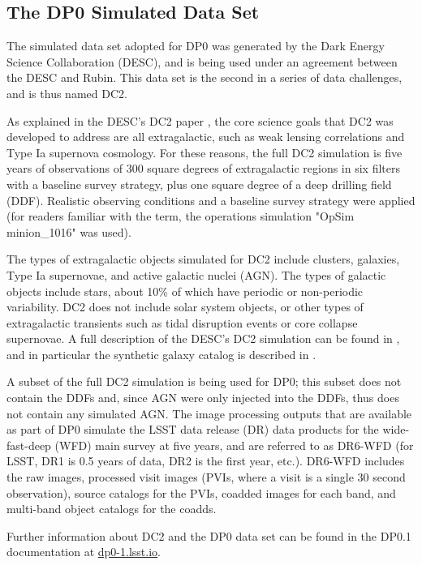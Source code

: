 \documentclass[DM,lsstdraft,authoryear,toc]{lsstdoc}
\begin{document}
\subsection{The DP0 Simulated Data Set}\label{ssec:intro_dc2}

The simulated data set adopted for DP0 was generated by the Dark Energy Science Collaboration (DESC), and is being used under an agreement between the DESC and Rubin.
This data set is the second in a series of data challenges, and is thus named DC2.

As explained in the DESC's DC2 paper \citep{2020arXiv201005926L}, the core science goals that DC2 was developed to address are all extragalactic, such as weak lensing correlations and Type Ia supernova cosmology.
For these reasons, the full DC2 simulation is five years of observations of 300 square degrees of extragalactic regions in six filters with a baseline survey strategy, plus one square degree of a deep drilling field (DDF).
Realistic observing conditions and a baseline survey strategy were applied (for readers familiar with the term, the operations simulation "OpSim minion\_1016" was used).

The types of extragalactic objects simulated for DC2 include clusters, galaxies, Type Ia supernovae, and active galactic nuclei (AGN).
The types of galactic objects include stars, about 10\% of which have periodic or non-periodic variability.
DC2 does not include solar system objects, or other types of extragalactic transients such as tidal disruption events or core collapse supernovae.
A full description of the DESC's DC2 simulation can be found in \citep{2020arXiv201005926L}, and in particular the synthetic galaxy catalog is described in \citet{2019ApJS..245...26K}.

A subset of the full DC2 simulation is being used for DP0; this subset does not contain the DDFs and, since AGN were only injected into the DDFs, thus does not contain any simulated AGN.
The image processing outputs that are available as part of DP0 simulate the LSST data release (DR) data products for the wide-fast-deep (WFD) main survey at five years, and are referred to as DR6-WFD (for LSST, DR1 is 0.5 years of data, DR2 is the first year, etc.).
DR6-WFD includes the raw images, processed visit images (PVIs, where a visit is a single 30 second observation), source catalogs for the PVIs, coadded images for each band, and multi-band object catalogs for the coadds.

Further information about DC2 and the DP0 data set can be found in the DP0.1 documentation at \url{dp0-1.lsst.io}.
\end{document}

